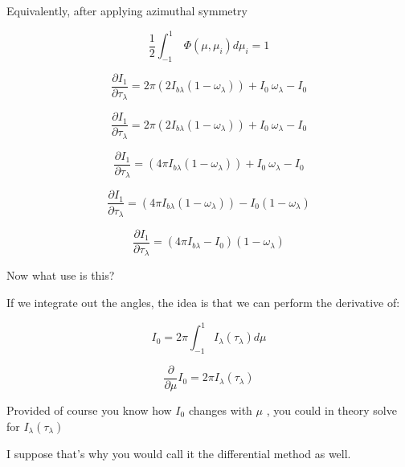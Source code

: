 \documentclass[12pt]{article}
\renewcommand{\_}{\kern-1.5pt\textunderscore\kern-1.5pt}
\begin{document}
\begin{itemize}
Equivalently, after applying azimuthal symmetry\par

 \[ \frac{1}{2} \int _{-1}^{1}~ \Phi  \left(  \mu , \mu _{i} \right) d \mu _{i}=1 \] \par

 \[ \frac{ \partial I_{1}}{ \partial  \tau_{ \lambda }}=2 \pi  \left( 2I_{b \lambda } \left( 1- \omega _{ \lambda } \right)  \right) +I_{0}~ \omega _{ \lambda } -I_{0} \] \par

 \[ \frac{ \partial I_{1}}{ \partial  \tau_{ \lambda }}=2 \pi  \left( 2I_{b \lambda } \left( 1- \omega _{ \lambda } \right)  \right) +I_{0}~ \omega _{ \lambda } -I_{0} \] \par

 \[ \frac{ \partial I_{1}}{ \partial  \tau_{ \lambda }}= \left( 4 \pi I_{b \lambda } \left( 1- \omega _{ \lambda } \right)  \right) +I_{0}~ \omega _{ \lambda } -I_{0} \] \par

 \[ \frac{ \partial I_{1}}{ \partial  \tau_{ \lambda }}= \left( 4 \pi I_{b \lambda } \left( 1- \omega _{ \lambda } \right)  \right) -I_{0} \left( 1- \omega _{ \lambda } \right)  \] \par

 \[ \frac{ \partial I_{1}}{ \partial  \tau_{ \lambda }}= \left( 4 \pi I_{b \lambda }-I_{0} \right)  \left( 1- \omega _{ \lambda } \right)  \] \par

Now what use is this?\par

If we integrate out the angles, the idea is that we can perform the derivative of:\par

 \[ I_{0}=2 \pi  \int _{-1}^{1}I_{ \lambda } \left(  \tau_{ \lambda } \right) d \mu  \] \par

 \[ \frac{ \partial }{ \partial  \mu }I_{0}=2 \pi  I_{ \lambda } \left(  \tau_{ \lambda } \right)  \] \par

Provided of course you know how  \( I_{0} \)  changes with  \(  \mu  \) , you could in theory solve for  \( I_{ \lambda } \left(  \tau_{ \lambda } \right)  \) \par

I suppose that’s why you would call it the differential method as well.\par


\end{itemize}
\end{document}
